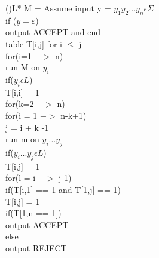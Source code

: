 \documentclass[12pt]{article}
\begin{document}
\begin{algorithm}[H]
    \Fn(){L*}{
    \SetAlgoLined
    \SetNoFillComment
    \DontPrintSemicolon
    M = Assume input y = $y_1y_2 ... y_n \epsilon \Sigma$\\
        if ($y = \varepsilon$){\\
            \hspace{0.5cm}output ACCEPT and end\\
        } 
        table T[i,j] for i $\leq$ j\\
        for(i=1 $->$ n){\\
            \hspace{0.5cm}run M on $y_i$\\
            \hspace{0.5cm}if($y_i \epsilon L$){\\
                \hspace{1cm}T[i,i] = 1\\
            }
        }
        for(k=2 $->$ n){\\
            \hspace{0.5cm}for(i = 1 $->$ n-k+1){\\
                \hspace{1cm}j = i + k -1\\
                \hspace{1cm}run m on $y_i ... y_j$\\
                \hspace{1cm}if($y_i ... y_j \epsilon L$){\\
                    \hspace{1.5cm}T[i,j] = 1\\}
                \hspace{1cm}for(l = i $->$ j-1){\\
                    \hspace{1.5cm}if(T[i,1] == 1 and T[1,j] == 1){\\
                        \hspace{2cm}T[i,j] = 1\\
                    }
                }
            }
        }
        if(T[1,n == 1]){\\
            \hspace{0.5cm} output ACCEPT \\
        }
        else{\\
            \hspace{0.5cm} output REJECT
        }
    }
    \end{algorithm}
\newpage
\end{document}
